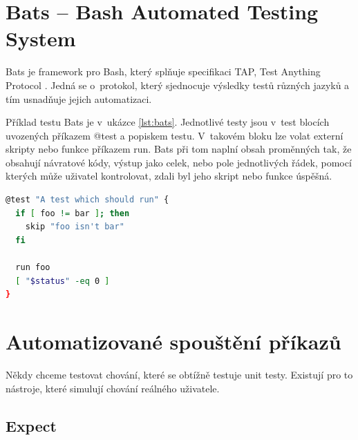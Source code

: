 \documentclass[thesis=M,czech]{FITthesis}[2012/06/26]
\begin{document}


\section{Bats -- Bash Automated Testing System}
Bats \cite{bats} je framework pro Bash, který splňuje specifikaci TAP, Test Anything Protocol \cite{tap}. Jedná se o~protokol, který sjednocuje výsledky testů různých jazyků a tím usnadňuje jejich automatizaci.

Příklad testu Bats je v~ukázce \ref{lst:bats}. Jednotlivé testy jsou v~test blocích uvozených příkazem @test a popiskem testu. V~takovém bloku lze volat externí skripty nebo funkce příkazem run. Bats při tom naplní obsah proměnných tak, že obsahují návratové kódy, výstup jako celek, nebo pole jednotlivých řádek, pomocí kterých může uživatel kontrolovat, zdali byl jeho skript nebo funkce úspěšná.

\noindent
\begin{minipage}{\linewidth}
\begin{lstlisting}[language=bash, caption={Bats}, label={lst:bats}]
@test "A test which should run" {
  if [ foo != bar ]; then
    skip "foo isn't bar"
  fi

  run foo
  [ "$status" -eq 0 ]
}
\end{lstlisting}
\end{minipage}




%
\section{Automatizované spouštění příkazů}

Někdy chceme testovat chování, které se obtížně testuje unit testy. Existují pro to nástroje, které simulují chování reálného uživatele.


\subsection{Expect}
\end{document}
